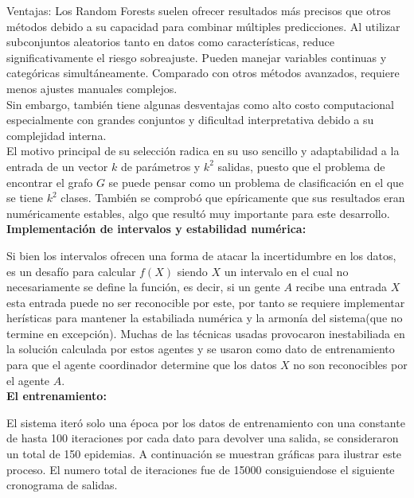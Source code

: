     Ventajas: Los Random Forests suelen ofrecer resultados más precisos que otros métodos debido a su capacidad para combinar múltiples predicciones. Al utilizar 
    subconjuntos aleatorios tanto en datos como características, reduce significativamente el riesgo sobreajuste. Pueden manejar variables continuas y categóricas 
    simultáneamente. Comparado con otros métodos avanzados, requiere menos ajustes manuales complejos. \\
    
    Sin embargo, también tiene algunas desventajas como alto costo computacional especialmente con grandes conjuntos y dificultad interpretativa debido a su 
    complejidad interna. \\

    El motivo principal de su selección radica en su uso sencillo y adaptabilidad a la entrada de un vector $k$ de parámetros y $k^2$ salidas, puesto que el problema 
    de encontrar el grafo $G$ se puede pensar como un problema de clasificación en el que se tiene $k^2$ clases. También se comprobó que epíricamente que sus resultados
    eran numéricamente estables, algo que resultó muy importante para este desarrollo. \\


    \textbf{Implementación de intervalos y estabilidad numérica:}

    Si bien los intervalos ofrecen una forma de atacar la incertidumbre en los datos, es un desafío para calcular $f(X)$ siendo $X$ un intervalo en el cual no 
    necesariamente se define la función, es decir, si un gente $A$ recibe una entrada $X$ esta entrada puede no ser reconocible por este, por tanto se requiere 
    implementar herísticas para mantener la estabiliada numérica y la armonía del sistema(que no termine en excepción). Muchas de las técnicas usadas provocaron 
    inestabiliada en la solución calculada por estos agentes y se usaron como dato de entrenamiento para que el agente coordinador determine que los datos $X$ no 
    son reconocibles por el agente $A$. \\

    \textbf{El entrenamiento:}

    El sistema iteró solo una época por los datos de entrenamiento con una constante de hasta 100 iteraciones por cada dato para devolver una salida, se consideraron un total de 150 epidemias. 
    A continuación se muestran gráficas para ilustrar este proceso. El numero total de iteraciones fue de 15000 consiguiendose el siguiente cronograma de salidas.


